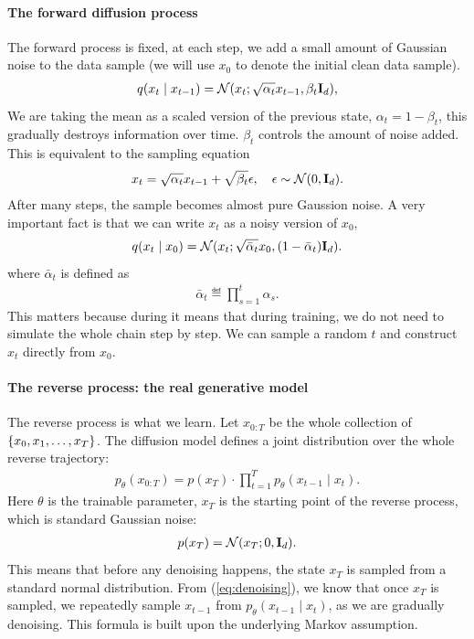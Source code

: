 \documentclass[11pt]{article}  %
\begin{document}
\paragraph{The forward diffusion process}
The forward process is fixed, at each step, we add a small amount of Gaussian noise to the data sample (we will use $x_0$ to denote the initial clean data sample).
\begin{align*}
  q(x_t \mid x_{t - 1}) = \mathcal{N} (x_t; \sqrt{\alpha_t} x_{t-1}, \beta_t \mathbf{I}_d),
\end{align*}
We are taking the mean as a scaled version of the previous state, $\alpha_t = 1 - \beta_t$, this gradually destroys information over time. 
$\beta_t$ controls the amount of noise added.
This is equivalent to the sampling equation 
\begin{align*}
  x_t = \sqrt{\alpha_t} x_{t - 1} + \sqrt{\beta_t}\epsilon, \quad \epsilon \sim \mathcal{N}(0, \mathbf{I}_d).
\end{align*}
After many steps, the sample becomes almost pure Gaussion noise.
A very important fact is that we can write $x_t$ as a noisy version of $x_0$,
\begin{align*}
  q(x_t \mid x_0) = \mathcal{N} (x_t; \sqrt{\bar{\alpha}_t}x_0, (1 - \bar{\alpha}_t)\mathbf{I}_d).
\end{align*}
where $\bar{\alpha}_t$ is defined as 
\begin{align*}
  \bar{\alpha}_t \eqdef \prod_{s=1}^{t} \alpha_s.
\end{align*}
This matters because during it means that during training, we do not need to simulate the whole chain step by step. We can sample a random $t$ and construct $x_t$ directly from $x_0$.


\paragraph{The reverse process: the real generative model}
The reverse process is what we learn.
Let $x_{0:T}$ be the whole collection of $\left\{ x_0, x_1, \hdots, x_T \right\}$.
The diffusion model defines a joint distribution over the whole reverse trajectory:
\begin{align}
  \label{eq:denoising}
  p_{\theta}(x_{0:T}) = p(x_T)\cdot \prod_{t=1}^T p_{\theta}(x_{t-1} \mid x_t).
\end{align}
Here $\theta$ is the trainable parameter, $x_T$ is the starting point of the reverse process, which is standard Gaussian noise: 
\begin{align*}
  p(x_T) = \mathcal{N}(x_T; 0, \mathbf{I}_d).
\end{align*}
This means that before any denoising happens, the state $x_T$ is sampled from a standard normal distribution.
From (\ref{eq:denoising}), we know that once $x_T$ is sampled, we repeatedly sample $x_{t-1}$ from $p_{\theta}(x_{t-1}\mid x_t)$, as we are gradually denoising.
This formula is built upon the underlying Markov assumption.
\end{document}
